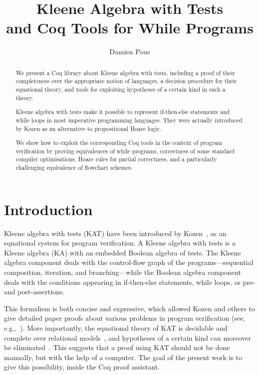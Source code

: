 \documentclass[a4paper]{llncs}
\title{Kleene Algebra with Tests \\
  and Coq Tools for While Programs} \author{Damien Pous} \institute{CNRS -- LIP, ENS Lyon, UMR 5668}
\begin{document}
\maketitle

\begin{abstract}
  We present a Coq library about Kleene algebra with tests, including
  a proof of their completeness over the appropriate notion of
  languages, a decision procedure for their equational theory, and
  tools for exploiting hypotheses of a certain kind in such a
  theory.

  Kleene algebra with tests make it possible to represent if-then-else
  statements and while loops in most imperative programming
  languages. They were actually introduced by Kozen as an alternative
  to propositional Hoare logic.

  We show how to exploit the corresponding Coq tools in the context of
  program verification by proving equivalences of while programs,
  correctness of some standard compiler optimisations, Hoare rules for
  partial correctness, and a particularly challenging equivalence of
  flowchart schemes.
\end{abstract}

\section*{Introduction}
\label{sec:intro}

Kleene algebra with tests (KAT) have been introduced by
Kozen~\cite{kozen:97:kat}, as an equational system for program
verification. A Kleene algebra with tests is a Kleene algebra (KA)
with an embedded Boolean algebra of tests.  The Kleene algebra
component deals with the control-flow graph of the
programs---sequential composition, iteration, and branching---while
the Boolean algebra component deals with the conditions appearing in
if-then-else statements, while loops, or pre- and post-assertions.

This formalism is both concise and expressive, which allowed Kozen
and others to give detailed paper proofs about various problems in
program verification (see,
e.g.,~\cite{kozen:97:kat,kozenp00:kat:compiler:opts,kozen00:kat:hoare,angusk01:kat:schemato}).
More importantly, the equational theory of KAT is decidable and
complete over relational
models~\cite{kozens96:kat:completeness:decidability}, and hypotheses
of a certain kind can moreover be
eliminated~\cite{cohen94:ka:hypotheses,hardink02:kat:hypotheses}.
This suggests that a proof using KAT should not be done manually, but
with the help of a computer. The goal of the present work is to give
this possibility, inside the Coq proof assistant.
\end{document}
